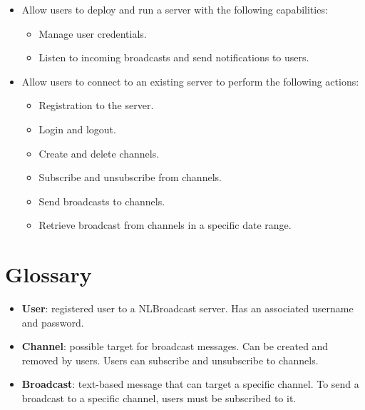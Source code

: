 \documentclass[12pt]{report}
\newcommand{\+}{\discretionary{\mbox{\scriptsize$\hookleftarrow$}}{}{}}
\renewcommand\emph{\textbf}
\begin{document}
                    \begin{itemize}
                        \item Allow users to deploy and run a server with the following capabilities:

                            \begin{itemize}
                                \item Manage user credentials.
                                \item Listen to incoming broadcasts and send notifications to users.
                            \end{itemize}

                        \item Allow users to connect to an existing server to perform the following actions:
                            \begin{itemize}
                                \item Registration to the server.
                                \item Login and logout.
                                \item Create and delete channels.
                                \item Subscribe and unsubscribe from channels.
                                \item Send broadcasts to channels.
                                \item Retrieve broadcast from channels in a specific date range.
                            \end{itemize}

                    \end{itemize}

        \section{Glossary}

            \begin{itemize}
                \item \emph{User}: registered user to a NLBroadcast server. Has an associated username and password.
                \item \emph{Channel}: possible target for broadcast messages. Can be created and removed by users. Users can subscribe and unsubscribe to channels.
                \item \emph{Broadcast}: text-based message that can target a specific channel. To send a broadcast to a specific channel, users must be subscribed to it.
            \end{itemize}
\end{document}
